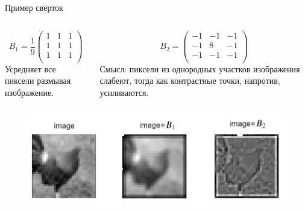 \documentclass[notheorems, handout]{beamer}
\begin{document}
\begin{frame}{Пример свёрток}
    \begin{columns}
        \begin{column}{0.5\textwidth}
            \[
                B _1 = \frac {1} {9} \begin{pmatrix}
                    1 & 1 & 1\\
                    1 & 1 & 1\\
                    1 & 1 & 1\\
                \end{pmatrix}
            \]
            Усредняет все пиксели размывая изображение.
        \end{column}

        \begin{column}{0.6\textwidth}
            \[
                B _2 = \begin{pmatrix}
                    -1 & -1 & -1\\
                    -1 & 8 & -1\\
                    -1 & -1 & -1\\
                \end{pmatrix}
            \]
            Смысл: пиксели из однородных участков изображения слабеют, тогда как контрастные точки, напротив, усиливаются.
        \end{column}
    \end{columns}
    

    \begin{figure}
        \includegraphics[width=\textwidth]{img/conv_example.jpg}
    \end{figure}
\end{frame}
\end{document}
